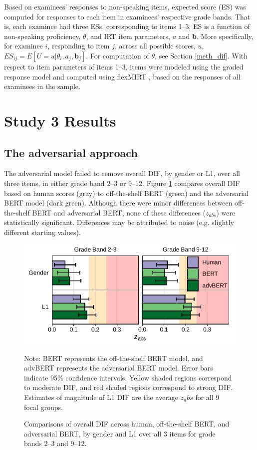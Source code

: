 \documentclass [PhD] {uclathes}
\begin{document}
Based on examinees’ responses to non-speaking items, expected score (ES) was computed for responses to each item in examinees’ respective grade bands. That is, each examinee had three ESs, corresponding to items 1–3. ES is a function of non-speaking proficiency, $\theta$, and IRT item parameters, $a$ and \textbf{b}. More specifically, for examinee $i$, responding to item $j$, across all possible scores, $u$, $ES_{ij} = E[U=u|\theta_i, a_j, \textbf{b}_j]$. For computation of $\theta$, see Section \ref{meth_dif}. With respect to item parameters of items 1–3, items were modeled using the graded response model \citep{samejima1997graded} and computed using flexMIRT \citep{cai2012flexmirt}, based on the responses of all examinees in the sample. 

\section{Study 3 Results}

\subsection{The adversarial approach}

The adversarial model failed to remove overall DIF, by gender or L1, over all three items, in either grade band 2–3 or 9–12. Figure \ref{advBERT_zabs_ovr} compares overall DIF based on human scores (gray) to off-the-shelf BERT (green) and the adversarial BERT model (dark green). Although there were minor differences between off-the-shelf BERT and adversarial BERT, none of these differences ($z_{abs}$) were statistically significant. Differences may be attributed to noise (e.g. slightly different starting values). 

\begin{figure}[h]
    \centering
    \caption{Comparisons of overall DIF across human, off-the-shelf BERT, and adversarial BERT, by gender and L1 over all 3 items for grade bands 2–3 and 9–12.}    
    \includegraphics[width=4.5in]{figures/20230517_ETS-DIF_advBERT_zabs_ovr_edit.pdf}
    \label{advBERT_zabs_ovr}
	{\newline Note: BERT represents the off-the-shelf BERT model, and advBERT represents the adversarial BERT model. Error bars indicate 95\% confidence intervals. Yellow shaded regions correspond to moderate DIF, and red shaded regions correspond to strong DIF. Estimates of magnitude of L1 DIF are the average $z_abs$ for all 9 focal groups. \par}
\end{figure}
\end{document}
